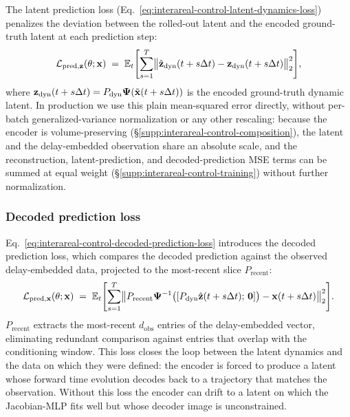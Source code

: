 The latent prediction loss (Eq.~\ref{eq:interareal-control-latent-dynamics-loss}) penalizes the deviation between the rolled-out latent and the encoded ground-truth latent at each prediction step:
\begin{equation}
\mathcal{L}_{\mathrm{pred},\vb{z}}(\theta;\vb{x}) \;=\; \mathbb{E}_{t}\Biggl[\sum_{s=1}^{T}\bigl\|\hat{\vb{z}}_{\mathrm{dyn}}(t+s\Delta t)-\vb{z}_{\mathrm{dyn}}(t+s\Delta t)\bigr\|_{2}^{2}\Biggr],
\end{equation}
where $\vb{z}_{\mathrm{dyn}}(t+s\Delta t)=P_{\mathrm{dyn}}\vb{\Psi}(\tilde{\vb{x}}(t+s\Delta t))$ is the encoded ground-truth dynamic latent. In production we use this plain mean-squared error directly, without per-batch generalized-variance normalization or any other rescaling: because the encoder is volume-preserving (\S\ref{supp:interareal-control-composition}), the latent and the delay-embedded observation share an absolute scale, and the reconstruction, latent-prediction, and decoded-prediction MSE terms can be summed at equal weight (\S\ref{supp:interareal-control-training}) without further normalization.

\subsubsection{Decoded prediction loss}\label{supp:interareal-control-decoded-pred}

Eq.~\ref{eq:interareal-control-decoded-prediction-loss} introduces the decoded prediction loss, which compares the decoded prediction against the observed delay-embedded data, projected to the most-recent slice $P_{\mathrm{recent}}$:
\begin{equation}
\mathcal{L}_{\mathrm{pred},\vb{x}}(\theta;\vb{x}) \;=\; \mathbb{E}_{t}\Biggl[\sum_{s=1}^{T}\bigl\|P_{\mathrm{recent}}\vb{\Psi}^{-1}\bigl([P_{\mathrm{dyn}}\hat{\vb{z}}(t+s\Delta t);\,\vb{0}]\bigr)-\vb{x}(t+s\Delta t)\bigr\|_{2}^{2}\Biggr].
\end{equation}
$P_{\mathrm{recent}}$ extracts the most-recent $d_{\mathrm{obs}}$ entries of the delay-embedded vector, eliminating redundant comparison against entries that overlap with the conditioning window. This loss closes the loop between the latent dynamics and the data on which they were defined: the encoder is forced to produce a latent whose forward time evolution decodes back to a trajectory that matches the observation. Without this loss the encoder can drift to a latent on which the Jacobian-MLP fits well but whose decoder image is unconstrained.

